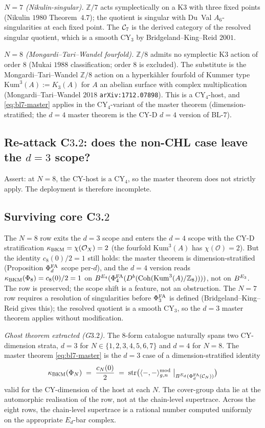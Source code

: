 \emph{$N = 7$ (Nikulin-singular).} $\mathbb{Z}/7$ acts symplectically
on a K$3$ with three fixed points (Nikulin $1980$ Theorem~$4.7$); the
quotient is singular with Du~Val $A_6$-singularities at each fixed
point. The $\mathcal{C}_7$ is the derived category of the resolved singular
quotient, which is a smooth CY$_3$ by Bridgeland--King--Reid $2001$.

\emph{$N = 8$ (Mongardi--Tari--Wandel fourfold).} $\mathbb{Z}/8$ admits
no symplectic K$3$ action of order $8$ (Mukai $1988$ classification;
order $8$ is excluded). The substitute is the
Mongardi--Tari--Wandel $\mathbb{Z}/8$ action on a hyperk\"ahler
fourfold of Kummer type $\mathrm{Kum}^3(A) := K_3(A)$ for
$A$ an abelian surface with complex multiplication (Mongardi--Tari--Wandel
$2018$ \texttt{arXiv:1712.07898}). This is a CY$_4$-host, and
\eqref{eq:bl7-master} applies in the CY$_4$-variant of the master
theorem (dimension-stratified; the $d = 4$ master theorem is the CY-D
$d = 4$ version of BL-$7$).

\subsection*{Re-attack C$3$.$2$: does the non-CHL case leave the
$d = 3$ scope?}

Assert: at $N = 8$, the CY-host is a CY$_4$, so the master theorem
does not strictly apply. The deployment is therefore incomplete.

\subsection*{Surviving core C$3$.$2$}

The $N = 8$ row exits the $d = 3$ scope and enters the $d = 4$ scope
with the CY-D stratification $\kappa_{\mathrm{BKM}} = \chi(\mathcal{O}_X) = 2$ (the
fourfold $\mathrm{Kum}^3(A)$ has $\chi(\mathcal{O}) = 2$). But the
identity $c_8(0)/2 = 1$ still holds: the master theorem is
dimension-stratified (Proposition $\Phi^{\mathrm{FA}}_d$ scope per-$d$), and the
$d = 4$ version reads $\kappa_{\mathrm{BKM}}(\Phi_8) = c_8(0)/2 = 1$ on
$B^{E_{4}}(\Phi^{\mathrm{FA}}_4(D^b(\mathrm{Coh}(\mathrm{Kum}^3(A) / \mathbb{Z}_8))))$, not on
$B^{E_{3}}$. The row is preserved; the scope shift is a feature, not an
obstruction. The $N = 7$ row requires a resolution of singularities
before $\Phi^{\mathrm{FA}}_{3}$ is defined (Bridgeland--King--Reid gives this); the
resolved quotient is a smooth CY$_3$, so the $d = 3$ master theorem
applies without modification.

\emph{Ghost theorem extracted (G$3$.$2$).} The 8-form catalogue
naturally spans two CY-dimension strata, $d = 3$ for $N \in
\{1, 2, 3, 4, 5, 6, 7\}$ and $d = 4$ for $N = 8$. The master theorem
\eqref{eq:bl7-master} is the $d = 3$ case of a dimension-stratified
identity
\[
 \kappa_{\mathrm{BKM}}(\Phi_N) \;=\; \frac{c_N(0)}{2} \;=\;
   \mathrm{str}\bigl(
       \langle -, - \rangle^{\mathrm{mod}}_{g, n}
       \bigm|_{B^{E_{d}}(\Phi^{\mathrm{FA}}_d(\mathcal{C}_N))}
   \bigr)
\]
valid for the CY-dimension of the host at each $N$. The
cover-group data lie at the automorphic realisation of the row, not at
the chain-level supertrace. Across the eight rows, the chain-level
supertrace is a rational number computed uniformly on the appropriate
$E_d$-bar complex.

